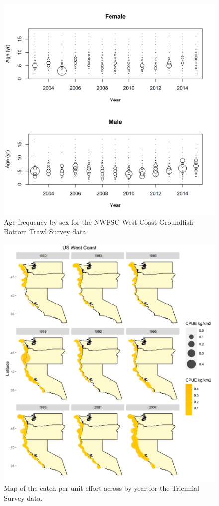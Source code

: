 \documentclass[12pt,]{article}
\begin{document}
\FloatBarrier

\begin{figure}
\centering
\includegraphics{Figures/NWFSC Groundfish Bottom Trawl Survey_Age_Frequency.png}
\caption{Age frequency by sex for the NWFSC West Coast Groundfish Bottom
Trawl Survey data. \label{fig:nw_age_freq}}
\end{figure}

\FloatBarrier

\begin{figure}
\centering
\includegraphics{Figures/Triennial_CPUE_Map_Year.png}
\caption{Map of the catch-per-unit-effort across by year for the
Triennial Survey data. \label{fig:tri_map}}
\end{figure}
\end{document}
